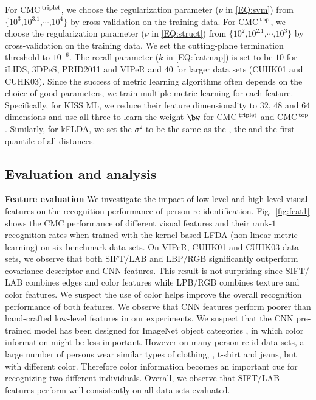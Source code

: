 \documentclass[10pt,twocolumn,letterpaper]{article}
\def\CMCstruct{{\rm CMC$^{\,\rm top}$}\xspace}
\def\CMCtriplet{{\rm CMC$^{\,\rm triplet}$}\xspace}
\renewcommand{\paragraph}{\textbf}
\begin{document}
For \CMCtriplet, we
choose the regularization parameter
($\nu$ in \eqref{EQ:svm}) from
$\{10^{3}$,$10^{3.1}$,$\cdots$,$10^{4}\}$ by cross-validation
on the training data.
For \CMCstruct, we choose the
regularization parameter ($\nu$ in \eqref{EQ:struct})
from $\{10^{2}$,$10^{2.1}$,$\cdots$,$10^{3}\}$ by cross-validation
on the training data.
We set the cutting-plane termination threshold to $10^{-6}$.
The recall parameter ($k$ in \eqref{EQ:featmap}) is set
to be $10$ for iLIDS, 3DPeS, PRID2011
and VIPeR and $40$ for larger data sets (CUHK01 and CUHK03).
Since the success of metric learning algorithms often depends on the choice
of good parameters, we train multiple metric learning for each feature.
Specifically, for KISS ML, we reduce their feature dimensionality
to $32$, $48$ and $64$ dimensions and use all three to learn
the weight $\bw$ for \CMCtriplet and \CMCstruct.
Similarly, for kFLDA, we set the
$\sigma^2$ to be the same as the , the
 and the first quantile of all distances.






\subsection{Evaluation and analysis}
\paragraph{Feature evaluation}
We investigate the impact of low-level and high-level
visual features on the recognition performance of
person re-identification.
Fig.~\ref{fig:feat1} shows the CMC performance of different
visual features and their rank-$1$ recognition rates
when trained with the
kernel-based LFDA
(non-linear metric learning) on six benchmark
data sets.
On VIPeR, CUHK01 and CUHK03 data sets,
we observe that both SIFT$/$LAB and LBP$/$RGB
significantly outperform
covariance descriptor and CNN features.
This result is not surprising since
SIFT$/$LAB combines edges and color features
while LPB$/$RGB combines texture and color features.
We suspect the use of color
helps improve the overall recognition performance
of both features.
We observe that CNN features perform poorer than
hand-crafted low-level features in our experiments.
We suspect that the CNN pre-trained model
has been designed for ImageNet object categories
\cite{Krizhevsky2012Imagenet},
in which color information might be less important.
However on many person re-id data sets,
a large number of persons wear similar types
of clothing, \eg, t-shirt and jeans,
but with different color.
Therefore color information becomes an important cue for recognizing two
different individuals.
Overall, we observe that SIFT$/$LAB features perform
well consistently on all data sets evaluated.
\end{document}
